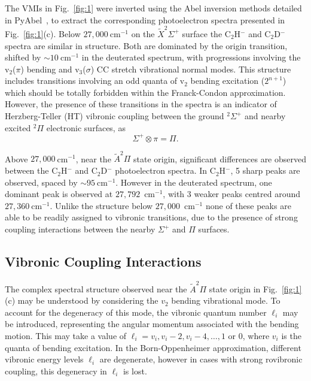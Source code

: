 \documentclass[journal=jpcafh,manuscript=article,layout=onecolumn, 12pt]{achemso}
\begin{document}
The VMIs in Fig.~\ref{fig:1} were inverted using the Abel inversion methods detailed in PyAbel~\cite{hic19}, to extract the corresponding photoelectron spectra presented in Fig.~\ref{fig:1}(c). Below $27,000~$cm$^{-1}$ on the $\tilde{X} ^2\Sigma^+$ surface the C$_2$H$^-$ and C$_2$D$^-$ spectra are similar in structure. Both are dominated by the origin transition, shifted by $\sim10~$cm$^{-1}$ in the deuterated spectrum, with progressions involving the v$_2$($\pi$) bending and v$_3$($\sigma$) CC stretch vibrational normal modes. This structure includes transitions involving an odd quanta of v$_2$ bending excitation ($2^{n+1}$) which should be totally forbidden within the Franck-Condon approximation. However, the presence of these transitions in the spectra is an indicator of Herzberg-Teller (HT) vibronic coupling between the ground $^2\Sigma^+$ and nearby excited $^2\Pi$ electronic surfaces, as
\begin{equation}
\Sigma^+ \otimes \pi = \Pi. 
\end{equation}

Above $27,000~$cm$^{-1}$, near the $\tilde{A}^2\Pi$ state origin, significant differences are observed between the C$_2$H$^-$ and C$_2$D$^-$ photoelectron spectra. In C$_2$H$^-$, 5 sharp peaks are observed, spaced by $\sim95~$cm$^{-1}$. However in the deuterated spectrum, one dominant peak is observed at $27,792$~cm$^{-1}$, with 3 weaker peaks centred around $27,360~$cm$^{-1}$. Unlike the structure below $27,000$~cm$^{-1}$ none of these peaks are able to be readily assigned to vibronic transitions, due to the presence of strong coupling interactions between the nearby $\Sigma^+$ and $\Pi$ surfaces.




\subsection{Vibronic Coupling Interactions}
The complex spectral structure observed near the $\tilde{A}^2\Pi$ state origin in Fig.~\ref{fig:1}(c) may be understood by considering the $v_2$ bending vibrational mode. To account for the degeneracy of this mode, the vibronic quantum number $\ell_i$ may be introduced, representing the angular momentum associated with the bending motion. This may take a value of $\ell_i = v_i, v_i-2, v_i-4,\dots,1$ or $0$, where $v_i$ is the quanta of bending excitation. In the Born-Oppenheimer approximation, different vibronic energy levels $\ell_i$ are degenerate, however in cases with strong rovibronic coupling, this degeneracy in $\ell_i$ is lost. 
\end{document}
